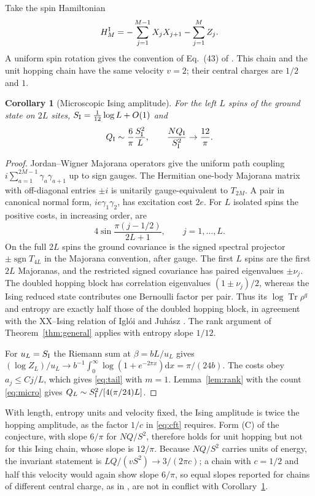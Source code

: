 \documentclass[11pt,a4paper]{article}
\newtheorem{corollary}[theorem]{Corollary}
\theoremstyle{remark}
\newcommand{\Tr}{\operatorname{Tr}}
\newcommand{\dd}{\mathrm d}
\begin{document}
Take the spin Hamiltonian
\[
 H_M^{\rm I}=-\sum_{j=1}^{M-1} X_jX_{j+1}-\sum_{j=1}^{M} Z_j .
\]
A uniform spin rotation gives the convention of Eq.~(43) of \cite{mula}. This chain and the unit hopping chain have the same velocity $v=2$; their central charges are $1/2$ and $1$.

\begin{corollary}[Microscopic Ising amplitude]\label{cor:ising}
For the left $L$ spins of the ground state on $2L$ sites, $S_{\rm I}=\tfrac1{12}\log L+O(1)$ and
\begin{equation}
 Q_{\rm I}\sim\frac{6}{\pi}\frac{S_{\rm I}^2}{L},
 \qquad \frac{NQ_{\rm I}}{S_{\rm I}^2}\to\frac{12}{\pi}.
 \label{eq:ising}
\end{equation}
\end{corollary}
\begin{proof}
Jordan--Wigner Majorana operators give the uniform path coupling $i\sum_{a=1}^{2M-1}\gamma_a\gamma_{a+1}$ up to sign gauges. The Hermitian one-body Majorana matrix with off-diagonal entries $\pm i$ is unitarily gauge-equivalent to $T_{2M}$. A pair in canonical normal form, $ie\gamma_1\gamma_2$, has excitation cost $2e$. For $L$ isolated spins the positive costs, in increasing order, are
\[
 4\sin\frac{\pi(j-1/2)}{2L+1},\qquad j=1,\ldots,L .
\]
On the full $2L$ spins the ground covariance is the signed spectral projector $\pm\operatorname{sgn}T_{4L}$ in the Majorana convention, after gauge. The first $L$ spins are the first $2L$ Majoranas, and the restricted signed covariance has paired eigenvalues $\pm\nu_j$. The doubled hopping block has correlation eigenvalues $(1\pm\nu_j)/2$, whereas the Ising reduced state contributes one Bernoulli factor per pair. Thus its $\log\Tr\rho^q$ and entropy are exactly half those of the doubled hopping block, in agreement with the XX--Ising relation of Igl\'oi and Juh\'asz \cite{igloi}. The rank argument of Theorem~\ref{thm:general} applies with entropy slope $1/12$.

For $u_L=S_{\rm I}$ the Riemann sum at $\beta=bL/u_L$ gives $(\log Z_L)/u_L\to b^{-1}\int_0^\infty\log(1+e^{-2\pi x})\dd x=\pi/(24b)$. The costs obey $a_j\le Cj/L$, which gives \eqref{eq:tail} with $m=1$. Lemma~\ref{lem:rank} with the count \eqref{eq:micro} gives $Q_L\sim S_{\rm I}^2/[4(\pi/24)L]$.
\end{proof}
With length, entropy units and velocity fixed, the Ising amplitude is twice the hopping amplitude, as the factor $1/c$ in \eqref{eq:cft} requires. Form (C) of the conjecture, with slope $6/\pi$ for $NQ/S^2$, therefore holds for unit hopping but not for this Ising chain, whose slope is $12/\pi$. Because $NQ/S^2$ carries units of energy, the invariant statement is $LQ/(vS^2)\to3/(2\pi c)$; a chain with $c=1/2$ and half this velocity would again show slope $6/\pi$, so equal slopes reported for chains of different central charge, as in \cite{mitra}, are not in conflict with Corollary~\ref{cor:ising}.
\end{document}
